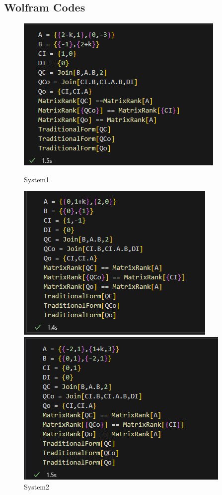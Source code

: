 \documentclass[12pt,a4paper,oneside]{ctexart}
\begin{document}
            \subsection{Wolfram Codes}
            \begin{figure}[p]
                \centering
                \includegraphics[height = 0.2\textheight]{../T1S1.PNG}
                \caption{System1}
                \includegraphics[height = 0.2\textheight]{../T1S2.PNG}
                \caption{System2}
                \includegraphics[height = 0.2\textheight]{../T1S3.PNG}

\end{figure}
\end{document}
